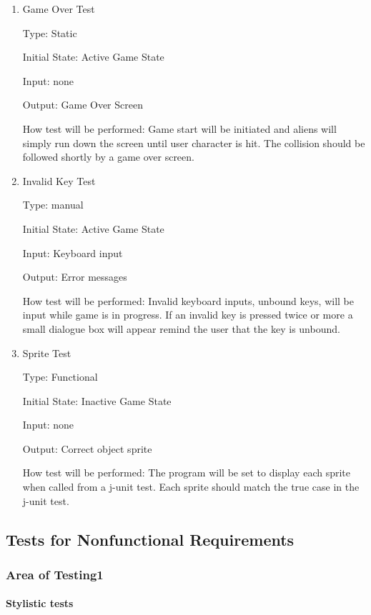 \documentclass[12pt, titlepage]{article}
\begin{document}
\begin{enumerate}
\item{Game Over Test\\}

Type: Static

Initial State: Active Game State 

Input: none

Output: Game Over Screen 

How test will be performed: Game start will be initiated and aliens will simply run down the screen until user character is hit. The collision should be followed shortly by a game over screen. 

\item{Invalid Key Test\\}

Type: manual

Initial State: Active Game State 

Input: Keyboard input

Output: Error messages

How test will be performed: Invalid keyboard inputs, unbound keys, will be input while game is in progress. If an invalid key is pressed twice or more a small dialogue box will appear remind the user that the key is unbound. 

\item{Sprite Test\\}

Type: Functional 

Initial State: Inactive Game State

Input: none

Output: Correct object sprite

How test will be performed: The program will be set to display each sprite when called from a j-unit test. Each sprite should match the true case in the j-unit test. 

\end{enumerate}

\subsection{Tests for Nonfunctional Requirements}

\subsubsection{Area of Testing1}
		
\paragraph{Stylistic tests}
\end{document}
